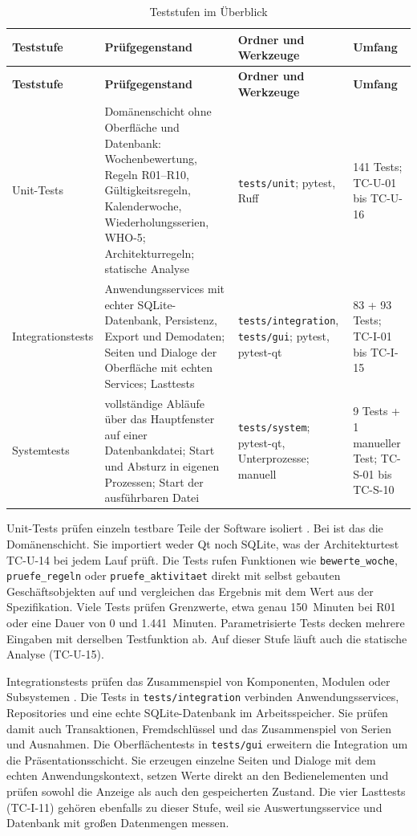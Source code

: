 \begin{longtable}{@{}L{2.6cm}L{6.3cm}L{3.9cm}L{2.9cm}@{}}
  \caption{Teststufen im Überblick}\label{tab:teststufen}\\
  \toprule
  \textbf{Teststufe} & \textbf{Prüfgegenstand} & \textbf{Ordner und Werkzeuge} & \textbf{Umfang} \\
  \midrule
  \endfirsthead
  \toprule
  \textbf{Teststufe} & \textbf{Prüfgegenstand} & \textbf{Ordner und Werkzeuge} & \textbf{Umfang} \\
  \midrule
  \endhead
  \bottomrule
  \endfoot
  Unit-Tests & Domänenschicht ohne Oberfläche und Datenbank: Wochenbewertung, Regeln R01--R10, Gültigkeitsregeln, Kalenderwoche, Wiederholungsserien, \acs{WHO}-5; Architekturregeln; statische Analyse & \texttt{tests/unit}; pytest, Ruff & 141 Tests; TC-U-01 bis TC-U-16 \\
  Integrationstests & Anwendungsservices mit echter SQLite-Datenbank, Persistenz, Export und Demodaten; Seiten und Dialoge der Oberfläche mit echten Services; Lasttests & \texttt{tests/integration}, \texttt{tests/gui}; pytest, pytest-qt & 83 + 93 Tests; TC-I-01 bis TC-I-15 \\
  Systemtests & vollständige Abläufe über das Hauptfenster auf einer Datenbankdatei; Start und Absturz in eigenen Prozessen; Start der ausführbaren Datei & \texttt{tests/system}; pytest-qt, Unterprozesse; manuell & 9 Tests + 1 manueller Test; TC-S-01 bis TC-S-10 \\
\end{longtable}

Unit-Tests prüfen einzeln testbare Teile der Software isoliert \parencite[S.~5-6]{swebok2026}. Bei \Projektname{} ist das die Domänenschicht. Sie importiert weder Qt noch SQLite, was der Architekturtest TC-U-14 bei jedem Lauf prüft. Die Tests rufen Funktionen wie \texttt{bewerte\_woche}, \texttt{pruefe\_regeln} oder \texttt{pruefe\_aktivitaet} direkt mit selbst gebauten Geschäftsobjekten auf und vergleichen das Ergebnis mit dem Wert aus der Spezifikation. Viele Tests prüfen Grenzwerte, etwa genau 150~Minuten bei R01 oder eine Dauer von 0 und 1.441~Minuten. Parametrisierte Tests decken mehrere Eingaben mit derselben Testfunktion ab. Auf dieser Stufe läuft auch die statische Analyse (TC-U-15).

Integrationstests prüfen das Zusammenspiel von Komponenten, Modulen oder Subsystemen \parencite[S.~5-7]{swebok2026}. Die Tests in \texttt{tests/integration} verbinden Anwendungsservices, Repositories und eine echte SQLite-Datenbank im Arbeitsspeicher. Sie prüfen damit auch Transaktionen, Fremdschlüssel und das Zusammenspiel von Serien und Ausnahmen. Die Oberflächentests in \texttt{tests/gui} erweitern die Integration um die Präsentationsschicht. Sie erzeugen einzelne Seiten und Dialoge mit dem echten Anwendungskontext, setzen Werte direkt an den Bedienelementen und prüfen sowohl die Anzeige als auch den gespeicherten Zustand. Die vier Lasttests (TC-I-11) gehören ebenfalls zu dieser Stufe, weil sie Auswertungsservice und Datenbank mit großen Datenmengen messen.

